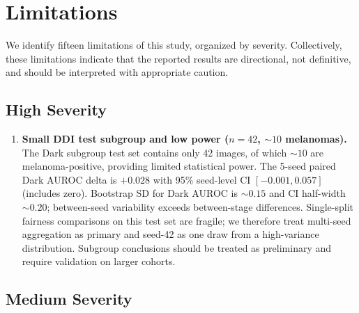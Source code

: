 \section{Limitations}

We identify fifteen limitations of this study, organized by severity. Collectively, these limitations indicate that the reported results are directional, not definitive, and should be interpreted with appropriate caution.

\subsection{High Severity}

\begin{enumerate}
    \item \textbf{Small DDI test subgroup and low power ($n=42$, $\sim10$ melanomas).} The Dark subgroup test set contains only 42 images, of which $\sim10$ are melanoma-positive, providing limited statistical power. The 5-seed paired Dark AUROC delta is $+0.028$ with 95\% seed-level CI $[-0.001, 0.057]$ (includes zero). Bootstrap SD for Dark AUROC is $\sim 0.15$ and CI half-width $\sim 0.20$; between-seed variability exceeds between-stage differences. Single-split fairness comparisons on this test set are fragile; we therefore treat multi-seed aggregation as primary and seed-42 as one draw from a high-variance distribution. Subgroup conclusions should be treated as preliminary and require validation on larger cohorts.
\end{enumerate}

\subsection{Medium Severity}

